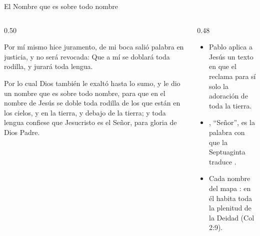 \begin{frame}{El Nombre que es sobre todo nombre}
\begin{columns}[c,onlytextwidth]
\begin{column}{0.50\textwidth}
\begin{cita}Por mí mismo hice juramento, de mi boca salió palabra en justicia, y no será revocada: Que a mí se doblará toda rodilla, y jurará toda lengua.\end{cita}
\begin{cita}Por lo cual Dios también le exaltó hasta lo sumo, y le dio un nombre que es sobre todo nombre, para que en el nombre de Jesús se doble toda rodilla de los que están en los cielos, y en la tierra, y debajo de la tierra; y toda lengua confiese que Jesucristo es el Señor, para gloria de Dios Padre.\end{cita}
\end{column}
\begin{column}{0.48\textwidth}\small
\begin{itemize}
\item Pablo aplica a Jesús un texto en que el \SENOR{} reclama para sí solo la adoración de toda la tierra.
\item {}, ``Señor'', es la palabra con que la Septuaginta traduce .
\item Cada nombre del mapa : en él habita toda la plenitud de la Deidad (Col 2:9).
\end{itemize}
\end{column}
\end{columns}
\end{frame}

